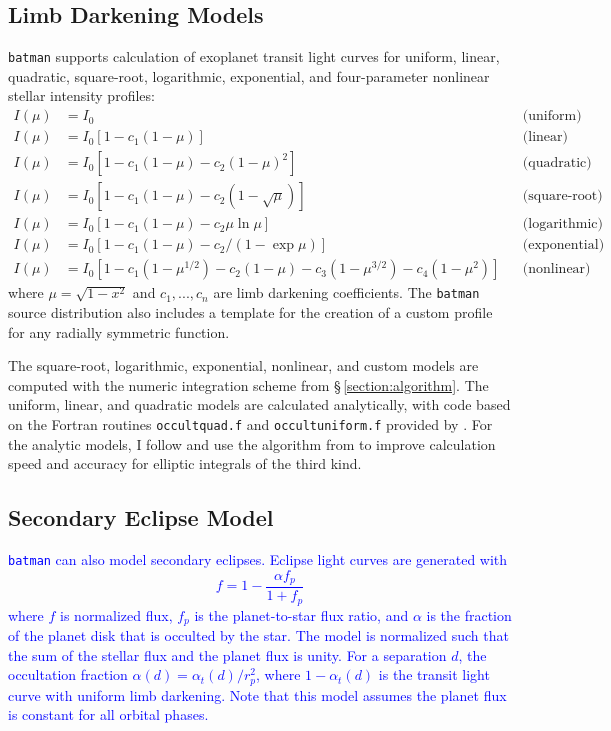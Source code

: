 \documentclass[12pt,preprint]{aastex}
\newcommand*{\blue}{\textcolor{blue}}
\begin{document}
\subsection{Limb Darkening Models}
\texttt{batman} supports calculation of exoplanet transit light curves for uniform, linear, quadratic, square-root, logarithmic, exponential, and four-parameter nonlinear stellar intensity profiles:
\begin{align}
  I(\mu) &= I_0                                                                         & &\text{(uniform)}             \\
  I(\mu) &= I_0[1 - c_1(1-\mu)]                                                         & &\text{(linear)}              \\
  I(\mu) &= I_0[1 - c_1(1 - \mu) - c_2(1-\mu)^2]                                        & &\text{(quadratic)}           \\
  I(\mu) &= I_0[1 - c_1(1 - \mu) - c_2(1-\sqrt{\mu})]                                   & &\text{(square-root)}         \\
  I(\mu) &= I_0[1 - c_1(1 - \mu) - c_2\mu\ln{\mu}]                                      & &\text{(logarithmic)}         \\
  I(\mu) &= I_0\left[1 - c_1(1 - \mu) - c_2/(1-\exp{\mu})\right]                  	& &\text{(exponential)}         \\
  I(\mu) &= I_0[1 - c_1(1-\mu^{1/2}) - c_2(1- \mu) - c_3(1-\mu^{3/2}) - c_4(1-\mu^2)]   & &\text{(nonlinear)}
\end{align}
where $\mu = \sqrt{1-x^2}$ and $c_1, ..., c_n$ are limb darkening coefficients.  The \texttt{batman} source distribution also includes a template for the creation of a custom profile for any radially symmetric function.  

The square-root, logarithmic, exponential, nonlinear, and custom models are computed with the numeric integration scheme from \S\,\ref{section:algorithm}.  The uniform, linear, and quadratic models are calculated analytically, with code based on the Fortran routines \texttt{occultquad.f} and \texttt{occultuniform.f} provided by \cite{mandel02}. For the analytic models, I follow \cite{eastman13} and use the algorithm from \cite{bulirsch65} to improve calculation speed and accuracy for elliptic integrals of the third kind.

\subsection{Secondary Eclipse Model}
\blue{\texttt{batman} can also model secondary eclipses. Eclipse light curves are generated with 
$$
f = 1 - \frac{\alpha f_p}{1 + f_p}
$$
where $f$ is normalized flux, $f_p$ is the planet-to-star flux ratio, and $\alpha$ is the fraction of the planet disk that is occulted by the star. The model is normalized such that the sum of the stellar flux and the planet flux is unity.  For a separation $d$, the occultation fraction $\alpha(d) = \alpha_t(d)/r_p^2$, where $1 - \alpha_t(d)$ is the transit light curve with uniform limb darkening. Note that this model assumes the planet flux is constant for all orbital phases.} 
\end{document}
